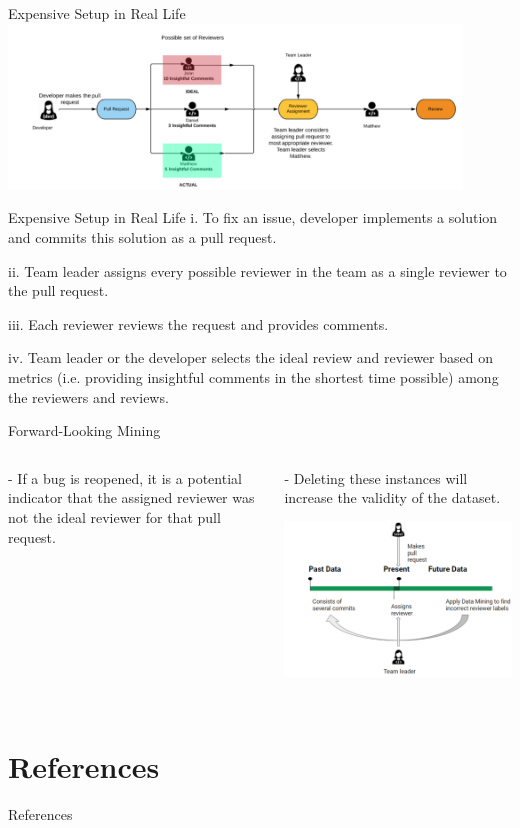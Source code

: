 \documentclass{beamer}
\begin{document}
    \begin{frame}{Expensive Setup in Real Life}
        \includegraphics[height=4.4cm]{sol1}

    \end{frame}
    \begin{frame}{Expensive Setup in Real Life}
    i. To fix an issue, developer implements a solution and
    commits this solution as a pull request.
    
    ii. Team leader assigns every possible reviewer in the team
    as a single reviewer to the pull request.
    
    iii. Each reviewer reviews the request and provides
    comments.
    
    iv. Team leader or the developer selects the ideal review and
    reviewer based on metrics (i.e. providing insightful
    comments in the shortest time possible) among the
    reviewers and reviews. 

    \end{frame}

    \begin{frame}{Forward-Looking Mining}
        \begin{columns}
        \centering 
        - If a bug is reopened, it is a potential indicator that the assigned
        reviewer was not the ideal reviewer for that pull request. 
        
        - Deleting these instances will increase the validity of the dataset.
        \includegraphics[height=4.8cm]{sol2}
        \end{columns}

    \end{frame}

\section{References}
\begin{frame}{References}

 
 \tiny
\end{frame}
\end{document}
